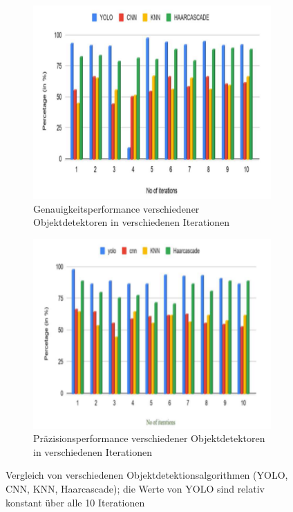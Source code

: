 {\begin{figure}[ht]
\begin{subfigure}[b]{0.45\textwidth}
        \includegraphics[width=\linewidth]{images/yolo_comp/yolo_acc_perf.png}
        \caption{Genauigkeitsperformance verschiedener Objektdetektoren in verschiedenen Iterationen \cite{Pavani2022}}
        \label{Scr:comp_object_detectorAcc}
    \end{subfigure}
    \hfill
    \begin{subfigure}[b]{0.45\textwidth}
        \centering
        \includegraphics[width=\linewidth]{images/yolo_comp/yolo_prec_perf.png}
        \caption{Präzisionsperformance verschiedener Objektdetektoren in verschiedenen Iterationen  \cite{Pavani2022}}
        \label{Scr:comp_object_detectorPrec}
    \end{subfigure} 
    \caption[Vergleich von verschiedenen Objektdetektionsalgorithmen (YOLO, CNN, KNN, Haarcascade)]{Vergleich von verschiedenen Objektdetektionsalgorithmen (YOLO, CNN, KNN, Haarcascade); die Werte von YOLO sind relativ konstant über alle 10 Iterationen \cite{Pavani2022}}
    \label{Scr:comp_object_detector}
\end{figure}
  
}
